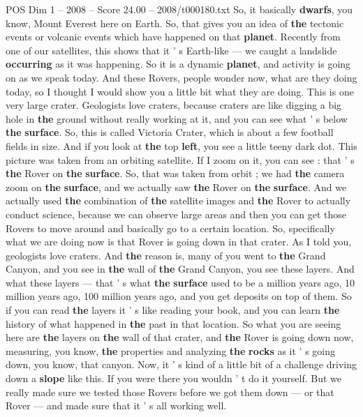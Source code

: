 \begin{textsample}{POS Dim 1 – 2008 – Score 24.00 – 2008/t000180.txt}
So, it basically \textbf{dwarfs}, you know, Mount Everest here on Earth.
So, that gives you an idea of \textbf{the} tectonic events or volcanic events which have happened on that \textbf{planet}.
Recently from one of our satellites, this shows that it ' s Earth-like — we caught a landslide \textbf{occurring} as it was happening.
So it is a dynamic \textbf{planet}, and activity is going on as we speak today.
And these Rovers, people wonder now, what are they doing today, so I thought I would show you a little bit what they are doing.
This is one very large crater.
Geologists love craters, because craters are like digging a big hole in \textbf{the} ground without really working at it, and you can see what ' s below \textbf{the} \textbf{surface}.
So, this is called Victoria Crater, which is about a few football fields in size.
And if you look at \textbf{the} top \textbf{left}, you see a little teeny dark dot.
This picture was taken from an orbiting satellite.
If I zoom on it, you can see : that ' s \textbf{the} Rover on \textbf{the} \textbf{surface}.
So, that was taken from orbit ; we had \textbf{the} camera zoom on \textbf{the} \textbf{surface}, and we actually saw \textbf{the} Rover on \textbf{the} \textbf{surface}.
And we actually used \textbf{the} combination of \textbf{the} satellite images and \textbf{the} Rover to actually conduct science, because we can observe large areas and then you can get those Rovers to move around and basically go to a certain location.
So, specifically what we are doing now is that Rover is going down in that crater.
As I told you, geologists love craters.
And \textbf{the} reason is, many of you went to \textbf{the} Grand Canyon, and you see in \textbf{the} wall of \textbf{the} Grand Canyon, you see these layers.
And what these layers — that ' s what \textbf{the} \textbf{surface} used to be a million years ago, 10 million years ago, 100 million years ago, and you get deposits on top of them.
So if you can read \textbf{the} layers it ' s like reading your book, and you can learn \textbf{the} history of what happened in \textbf{the} past in that location.
So what you are seeing here are \textbf{the} layers on \textbf{the} wall of that crater, and \textbf{the} Rover is going down now, measuring, you know, \textbf{the} properties and analyzing \textbf{the} \textbf{rocks} as it ' s going down, you know, that canyon.
Now, it ' s kind of a little bit of a challenge driving down a \textbf{slope} like this.
If you were there you wouldn ' t do it yourself.
But we really made sure we tested those Rovers before we got them down — or that Rover — and made sure that it ' s all working well.

\end{textsample}
